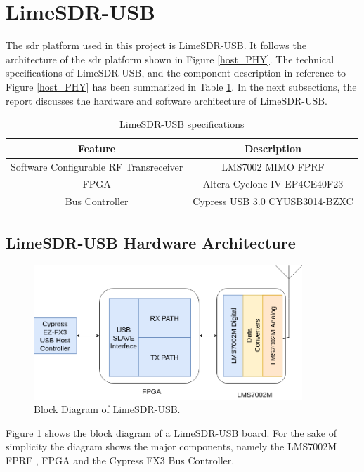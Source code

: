 \section{LimeSDR-USB}
The \ac{sdr} platform used in this project is LimeSDR-USB.
It follows the architecture of the \ac{sdr} platform shown in Figure \ref{host_PHY}.
The technical specifications of LimeSDR-USB, and the component description in reference to Figure \ref{host_PHY} has been summarized in Table \ref{specs}.
In the next subsections, the report discusses the hardware and software architecture of LimeSDR-USB.


\begin{table}[h!]
\centering
\begin{tabular}{|c|c|}
\hline
Feature & Description\\
\hline
Software Configurable RF Transreceiver & LMS7002 MIMO FPRF\\
\ac{FPGA} & Altera Cyclone IV EP4CE40F23 \\
Bus Controller & Cypress USB 3.0 CYUSB3014-BZXC\\

\hline
\end{tabular}
\caption{LimeSDR-USB specifications}
\label{specs}
\end{table}

\subsection{LimeSDR-USB Hardware Architecture}

\begin{figure}[h!]
\centering
\includegraphics[width=0.9\textwidth]{Figure/Lime_Hardware.png}
\caption{Block Diagram of LimeSDR-USB.}
\label{lime_hw_arch}
\end{figure}

Figure \ref{lime_hw_arch} shows the block diagram of a LimeSDR-USB board.
For the sake of simplicity the diagram shows the major components, namely the LMS7002M \ac{FPRF} \cite{noauthor_lms7002m_nodate}, \ac{FPGA} and the Cypress FX3 Bus Controller.

